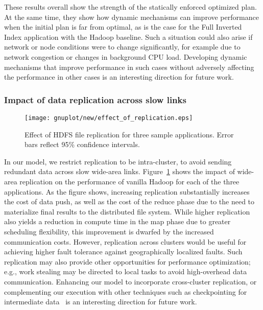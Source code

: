 These results overall show the strength of the statically enforced optimized
plan.
At the same time, they show how dynamic mechanisms can improve performance when
the initial plan is far from optimal, as is the case for the Full Inverted
Index application with the Hadoop baseline.
Such a situation could also arise if network or node conditions were to change
significantly, for example due to network congestion or changes in background
CPU load.
Developing dynamic mechanisms that improve performance in such cases without
adversely affecting the performance in other cases is an interesting direction
for future work.

\subsubsection{Impact of data replication across slow links}
\label{subsec:repl}

\begin{figure}[htbp]
  \centering
  \texttt{[image: gnuplot/new/effect\_of\_replication.eps]}
  \caption{Effect of HDFS file replication for three sample applications.
  Error bars reflect 95\% confidence intervals.
  \label{fig:effect_of_replication}}
\end{figure}

In our model, we restrict replication to be intra-cluster, to avoid sending
redundant data across slow wide-area links.
Figure~\ref{fig:effect_of_replication} shows the impact of wide-area
replication on the performance of vanilla Hadoop for each of the three
applications.
As the figure shows, increasing replication substantially increases the cost of
data push, as well as the cost of the reduce phase due to the need to
materialize final results to the distributed file system.
While higher replication also yields a reduction in compute time in the map
phase due to greater scheduling flexibility, this improvement is dwarfed by the
increased communication costs.
However, replication across clusters would be useful for achieving higher fault
tolerance against geographically localized faults.
Such replication may also provide other opportunities for performance
optimization; e.g., work stealing may be directed to local tasks to avoid
high-overhead data communication.
Enhancing our model to incorporate cross-cluster replication, or complementing
our execution with other techniques such as checkpointing for intermediate
data~\cite{ko10} is an interesting direction for future work.
